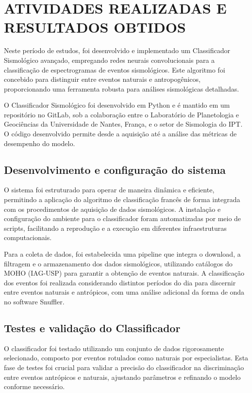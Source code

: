 \section{ATIVIDADES REALIZADAS E RESULTADOS OBTIDOS}
\label{sec:ativ_real}
\par{Neste período de estudos, foi desenvolvido e implementado um Classificador Sismológico avançado, empregando redes neurais convolucionais para a classificação de espectrogramas de eventos sismológicos. Este algoritmo foi concebido para distinguir entre eventos naturais e antropogênicos, proporcionando uma ferramenta robusta para análises sismológicas detalhadas.}

\par{O Classificador Sismológico foi desenvolvido em Python e é mantido em um repositório no GitLab, sob a colaboração entre o Laboratório de Planetologia e Geociências da Universidade de Nantes, França, e o setor de Sismologia do IPT. O código desenvolvido permite desde a aquisição até a análise das métricas de desempenho do modelo.}

\subsection{Desenvolvimento e configuração do sistema}
\label{subsec:desenvolvimento}
\par{O sistema foi estruturado para operar de maneira dinâmica e eficiente, permitindo a aplicação do algoritmo de classificação francês de forma integrada com os procedimentos de aquisição de dados sismológicos. A instalação e configuração do ambiente para o classificador foram automatizadas por meio de scripts, facilitando a reprodução e a execução em diferentes infraestruturas computacionais.}

\par{Para a coleta de dados, foi estabelecida uma pipeline que integra o download, a filtragem e o armazenamento dos dados sismológicos, utilizando catálogos do MOHO (IAG-USP) para garantir a obtenção de eventos naturais. A classificação dos eventos foi realizada considerando distintos períodos do dia para discernir entre eventos naturais e antrópicos, com uma análise adicional da forma de onda no software Snuffler.}

\subsection{Testes e validação do Classificador}
\label{subsec:testes_validacao}
\par{O classificador foi testado utilizando um conjunto de dados rigorosamente selecionado, composto por eventos rotulados como naturais por especialistas. Esta fase de testes foi crucial para validar a precisão do classificador na discriminação entre eventos antrópicos e naturais, ajustando parâmetros e refinando o modelo conforme necessário.}

